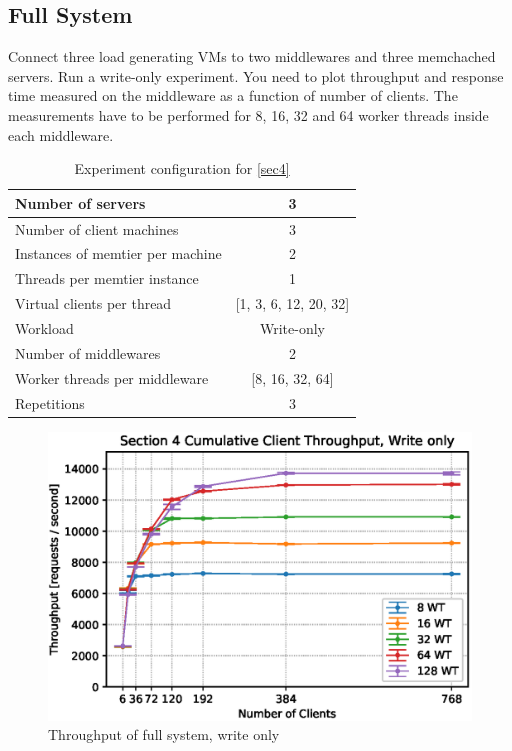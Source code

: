 \documentclass[11pt,a4paper]{article}
\begin{document}
\subsection{Full System} \label{sec4}

Connect three load generating VMs to two middlewares and three memchached servers. Run a write-only experiment. 
You need to plot throughput and response time measured on the middleware as a function of number of clients. The measurements have to be performed for 8, 16, 32 and 64 worker threads inside each middleware.

\begin{center}
    \begin{table}
		\begin{tabular}{|l|c|}
			\hline Number of servers                & 3                         \\ 
			\hline Number of client machines        & 3                         \\ 
			\hline Instances of memtier per machine & 2                         \\ 
			\hline Threads per memtier instance     & 1                         \\
			\hline Virtual clients per thread       & [1, 3, 6, 12, 20, 32]     \\ 
			\hline Workload                         & Write-only                \\
			\hline Number of middlewares            & 2                         \\
			\hline Worker threads per middleware    & [8, 16, 32, 64]           \\
			\hline Repetitions                      & 3                         \\ 
			\hline 
		\end{tabular}
		\caption{Experiment configuration for \autoref{sec4}} \label{exp4}
	\end{table}
\end{center}

\begin{figure}
    \includegraphics[width=1\linewidth]{plots/4b_throughputMiddleware.eps}
    \caption{Throughput of full system, write only}
    \label{fig:4-throughput}
\end{figure}
\end{document}
